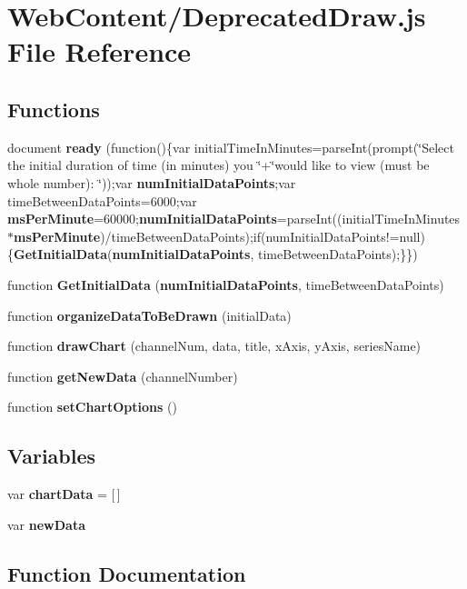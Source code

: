 \section{Web\-Content/\-Deprecated\-Draw.js File Reference}
\label{_deprecated_draw_8js}
\subsection*{Functions}
\begin{DoxyCompactItemize}
\item 
document {\bf ready} (function()\{var initial\-Time\-In\-Minutes=parse\-Int(prompt(\char`\"{}Select the initial duration of time (in minutes) you \char`\"{}+\char`\"{}would like to view (must be whole number)\-: \char`\"{}));var {\bf num\-Initial\-Data\-Points};var time\-Between\-Data\-Points=6000;var {\bf ms\-Per\-Minute}=60000;{\bf num\-Initial\-Data\-Points}=parse\-Int((initial\-Time\-In\-Minutes $\ast${\bf ms\-Per\-Minute})/time\-Between\-Data\-Points);if(num\-Initial\-Data\-Points!=null)\{{\bf Get\-Initial\-Data}({\bf num\-Initial\-Data\-Points}, time\-Between\-Data\-Points);\}\})
\item 
function {\bf Get\-Initial\-Data} ({\bf num\-Initial\-Data\-Points}, time\-Between\-Data\-Points)
\item 
function {\bf organize\-Data\-To\-Be\-Drawn} (initial\-Data)
\item 
function {\bf draw\-Chart} (channel\-Num, data, title, x\-Axis, y\-Axis, series\-Name)
\item 
function {\bf get\-New\-Data} (channel\-Number)
\item 
function {\bf set\-Chart\-Options} ()
\end{DoxyCompactItemize}
\subsection*{Variables}
\begin{DoxyCompactItemize}
\item 
var {\bf chart\-Data} = [$\,$]
\item 
var {\bf new\-Data}
\end{DoxyCompactItemize}


\subsection{Function Documentation}
